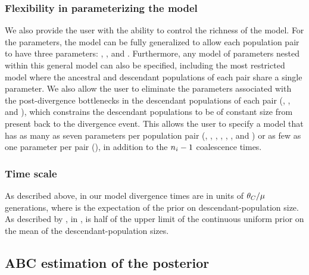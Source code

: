 \documentclass[letterpaper,12pt]{article}
\begin{document}
\begin{linenumbers}
\subsubsection*{Flexibility in parameterizing the model}
We also provide the user with the ability to control the richness of
the model.
For the \myTheta{} parameters, the model can be fully generalized to
allow each population pair to have three parameters:
\ancestralTheta{}, , and .
Furthermore, any model of \myTheta{} parameters nested within this
general model can also be specified, including the most restricted model
where the ancestral and descendant populations of each pair share
a single \myTheta{} parameter.
We also allow the user to eliminate the parameters associated with
the post-divergence bottlenecks in the descendant populations of
each pair
(\bottleTime{}, , and ),
which constrains the descendant populations to be of
constant size from present back to the divergence event.
This allows the user to specify a model that has as many as
seven parameters per population pair
(\ancestralTheta{}, , ,
\bottleTime{}, , , and
\migrationRate{})
or as few as
one parameter per pair
(\myTheta{}),
in addition to the $\popSampleSize{i}{} - 1$ coalescence times.

\subsubsection*{Time scale}
As described above, in our model divergence times are in units of
$\theta_{C}/\mu$ generations, where  is the expectation
of the prior on descendant-population size.
As described by \citet{Oaks2012}, in \msb,  is half of the upper
limit of the continuous uniform prior on the mean of the descendant-population
sizes.

\subsection*{ABC estimation of the posterior}

\end{linenumbers}
\end{document}

